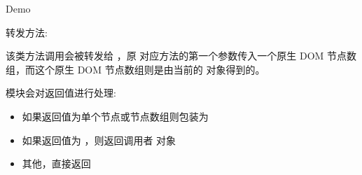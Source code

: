\documentclass[letterpaper,10pt,english]{sphinxmanual}
\begin{document}
Demo

转发方法:

该类方法调用会被转发给 {\hyperref[api/core/dom/index:module-DOM]{}} ，原  对应方法的第一个参数传入一个原生 DOM 节点数组，而这个原生 DOM 节点数组则是由当前的  对象得到的。

 模块会对返回值进行处理:
\begin{itemize}
\item {}
如果返回值为单个节点或节点数组则包装为 {\hyperref[api/core/node/nodelist:Node.NodeList]{}}

\item {}
如果返回值为  ，则返回调用者  对象

\item {}
其他，直接返回

\end{itemize}
\end{document}
